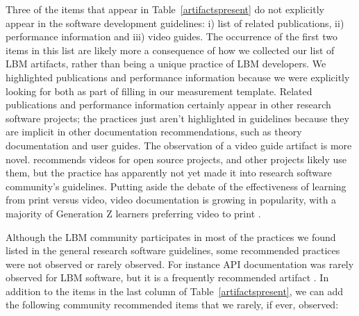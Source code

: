 \documentclass[final, 3p, times, authoryear]{elsarticle}
\begin{document}
Three of the items that appear in Table~\ref{artifactspresent} do not explicitly
appear in the software development guidelines: i) list of related publications,
ii) performance information and iii) video guides.  The occurrence of the first
two items in this list are likely more a consequence of how we collected our
list of LBM artifacts, rather than being a unique practice of LBM developers. We
highlighted publications and performance information because we were explicitly
looking for both as part of filling in our measurement template. Related
publications and performance information certainly appear in other research
software projects; the practices just aren't highlighted in guidelines because
they are implicit in other documentation recommendations, such as theory
documentation and user guides. The observation of a video guide artifact is more
novel.  \citet{Fogel2005} recommends videos for open source projects, and other
projects likely use them, but the practice has apparently not yet made it into
research software community's guidelines.  Putting aside the debate of the
effectiveness of learning from print versus video, video documentation is
growing in popularity, with a majority of Generation Z learners preferring video
to print \citep{Genota2018}.

Although the LBM community participates in most of the practices we found listed
in the general research software guidelines, some recommended practices were not
observed or rarely observed. For instance API documentation was rarely observed
for LBM software, but it is a frequently recommended artifact
\citep{SmithAndRoscoe2018, ThielEtAl2020, vanGompelEtAl2016, OrvizEtAl2017,
SSI2022, Zadka2018}.  In addition to the items in the last column of
Table~\ref{artifactspresent}, we can add the following community recommended
items that we rarely, if ever, observed:
\end{document}
